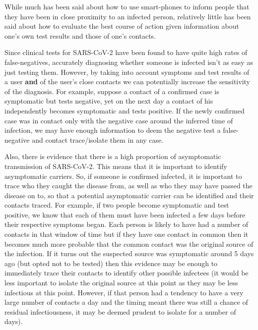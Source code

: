 \documentclass{article}
\begin{document}
While much has been said about how to use smart-phones to inform people that they have been in close proximity to an infected person\cite{dp3t}\cite{applegoogle}\cite{pepppt}, relatively little has been said about how to evaluate the best course of action given information about one's own test results and those of one's contacts.

Since clinical tests for SARS-CoV-2 have been found to have quite high rates of false-negatives\cite{fang2020sensitivity}, accurately diagnosing whether someone is infected isn't as easy as just testing them. However, by taking into account symptoms and test results of a user \textbf{and} of the user's close contacts we can potentially increase the sensitivity of the diagnosis. For example, suppose a contact of a confirmed case is symptomatic but tests negative, yet on the next day a contact of his independently becomes symptomatic and tests positive. If the newly confirmed case was in contact only with the negative case around the inferred time of infection, we may have enough information to deem the negative test a false-negative and contact trace/isolate them in any case.

Also, there is evidence that there is a high proportion of asymptomatic transmission of SARS-CoV-2\cite{lavezzo2020suppression}. This means that it is important to identify asymptomatic carriers. So, if someone is confirmed infected, it is important to trace who they caught the disease from, as well as who they may have passed the disease on to, so that a potential asymptomatic carrier can be identified and their contacts traced. For example, if two people become symptomatic and test positive, we know that each of them must have been infected a few days before their respective symptoms began. Each person is likely to have had a number of contacts in that window of time but if they have one contact in common then it becomes much more probable that the common contact was the original source of the infection. If it turns out the suspected source was symptomatic around 5 days ago (but opted not to be tested) then this evidence may be enough to immediately trace their contacts to identify other possible infectees (it would be less important to isolate the original source at this point as they may be less infectious at this point. However, if that person had a tendency to have a very large number of contacts a day and the timing meant there was still a chance of residual infectiousness, it may be deemed prudent to isolate for a number of days).
\end{document}
